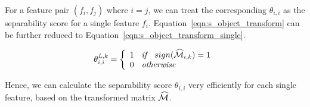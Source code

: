


 For a feature pair $(f_i,f_j)$ where $i=j$, we can treat the corresponding $\theta_{i,i}$ as the separability score for a single feature $f_i$. Equation~\ref{eqn:s_object_transform} can be further reduced to Equation~\ref{eqn:s_object_transform_single}.

\begin{equation}\label{eqn:s_object_transform_single}
\theta_{i,i}^{\lhat,k}=\left\{
  \begin{array}{ll}
   1 \textit{\hspace{2mm} if \hspace{2mm}} sign(\widehat{\mm}_{i,k}) = 1\\
   0 \textit{\hspace{2mm} otherwise \hspace{2mm}}
  \end{array}
  \right.
\end{equation}

Hence, we can calculate the separability score $\theta_{i,i}$ very efficiently for each single feature, based on the transformed matrix $\widehat{\mm}$.

